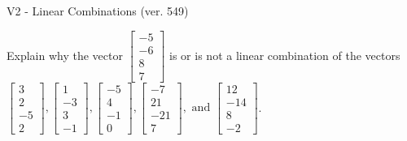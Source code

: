 \begin{exercise}
  \begin{exerciseTitle}V2 - Linear Combinations (ver. 549)\end{exerciseTitle}
  \begin{exerciseStatement}
    Explain why the vector \(\left[\begin{array}{c}
-5 \\
-6 \\
8 \\
7
\end{array}\right]\)  is or is not a linear 
	combination of the vectors \(\left[\begin{array}{c}
3 \\
2 \\
-5 \\
2
\end{array}\right] , \left[\begin{array}{c}
1 \\
-3 \\
3 \\
-1
\end{array}\right] , \left[\begin{array}{c}
-5 \\
4 \\
-1 \\
0
\end{array}\right] , \left[\begin{array}{c}
-7 \\
21 \\
-21 \\
7
\end{array}\right] , \text{ and } \left[\begin{array}{c}
12 \\
-14 \\
8 \\
-2
\end{array}\right]\).
	



\end{exerciseStatement}
\end{exercise}
